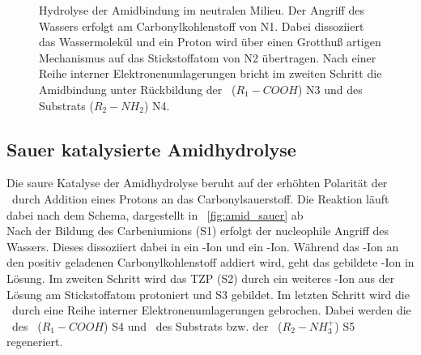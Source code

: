 \begin{figure}[H]
	\begin{flushleft}
	\end{flushleft}
	\caption[Hydrolyse der Amidbindung im neutralen Milieu]{Hydrolyse der Amidbindung im neutralen Milieu. Der Angriff des Wassers erfolgt am Carbonylkohlenstoff von N1. Dabei dissoziiert das Wassermolekül und ein Proton wird über einen Grotthuß artigen Mechanismus auf das Stickstoffatom von N2 übertragen. Nach einer Reihe interner Elektronenumlagerungen bricht im zweiten Schritt die Amidbindung unter Rückbildung der \spacer~($R_1-COOH$) N3 und des Substrats ($R_2-NH_2$) N4.}
	
	\label{fig:amid_neutral}
\end{figure}

\subsection{Sauer katalysierte Amidhydrolyse}
\label{subsec:sauer_katalysierte_amidhydrolyse}

Die saure Katalyse der Amidhydrolyse beruht auf der erhöhten Polarität der \carboxy~durch Addition eines Protons an das Carbonylsauerstoff. Die Reaktion läuft dabei nach dem Schema, dargestellt in \abb~\ref{fig:amid_sauer} ab \cites[288]{Latscha.2016}{Zahn.2004b}{Zahn.2003}\\

Nach der Bildung des Carbeniumions (S1) erfolgt der nucleophile Angriff des Wassers. Dieses dissoziiert dabei in ein -Ion und ein -Ion. Während das -Ion an den positiv geladenen Carbonylkohlenstoff addiert wird, geht das gebildete -Ion in Lösung. Im zweiten Schritt wird das \ac{TZP} (S2) durch ein weiteres -Ion aus der Lösung am Stickstoffatom protoniert und S3 gebildet. Im letzten Schritt wird die \amid~durch eine Reihe interner Elektronenumlagerungen gebrochen. Dabei werden die \carboxys~des \spacer~($R_1-COOH$) S4 und \aminos~des Substrats bzw. der \spitze~($R_2-NH_3^+$) S5 regeneriert.\\

